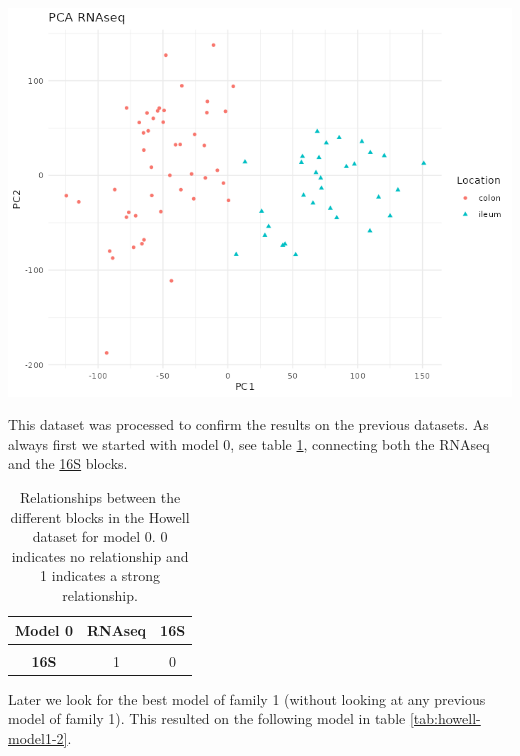 \documentclass[
  12pt,
  a4paper,
  twoside,
  openright]{book}
\let\origfigure\figure
\let\endorigfigure\endfigure
\renewenvironment{figure}[1][2] {
    \expandafter\origfigure\expandafter[!htbp]
} {
    \endorigfigure
}
\begin{document}
\begin{figure}
\includegraphics[width=1\linewidth]{images/howell_PCA_RNAseq} \caption[PCA of RNAseq data from the Howell dataset]{PCA of RNAseq data from the Howell dataset. There are two groups of samples according to their location. Each point represents a sample (colored and shaped by location).}\label{fig:howell-pca-RNAseq}
\end{figure}

This dataset was processed to confirm the results on the previous datasets.
As always first we started with model 0, see table \ref{tab:howell-model0}, connecting both the RNAseq and the \protect\hyperlink{acronyms_16S}{16S} blocks.

\begin{table}[H]

\caption[Model 0 of the Howell dataset.]{\label{tab:howell-model0}Relationships between the different blocks in the Howell dataset for model 0. 0 indicates no relationship and 1 indicates a strong relationship.}
\centering
\begin{tabular}[t]{>{}c|c|c}
\hline
\textbf{Model 0} & \textbf{RNAseq} & \textbf{16S}\\
\hline
\textbf{\cellcolor{gray!6}{RNAseq}} & \cellcolor{gray!6}{0} & \cellcolor{gray!6}{1}\\
\hline
\textbf{16S} & 1 & 0\\
\hline
\end{tabular}
\end{table}

Later we look for the best model of family 1 (without looking at any previous model of family 1).
This resulted on the following model in table \ref{tab:howell-model1-2}.
\end{document}
